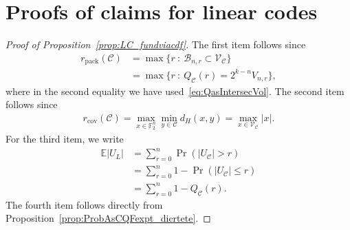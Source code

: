 \documentclass[article,doublecolumn]{IEEEtran}
\newcommand{\F}{{\mathbb{F}}}
\newcommand{\EE}{{\mathbb{E}}}
\newcommand{\BB}{{\mathcal{B}}}
\newcommand{\SSS}{{\mathcal{S}}}
\newcommand{\A}{{\mathcal{A}}}
\newcommand{\CC}{{\mathcal{C}}}
\newcommand{\rpack}{{r_{\mathrm{pack}}}}
\newcommand{\rcov}{{r_{\mathrm{cov}}}}
\newcommand{\VC}{\mathcal{V}_{\mathcal{C}}}
\begin{document}
\section{Proofs of claims for linear codes}
\label{app:discreteCDFproperties}

\begin{proof}[Proof of Proposition~\ref{prop:LC_fundviacdf}]
The first item follows since 
\begin{align}
\rpack(\CC)&=\max\{r~:~\BB_{n,r}\subset\VC\}\\
&=\max\{r~:~Q_{\CC}(r)=2^{k-n} V_{n,r}\},
\end{align}
where in the second equality we have used~\eqref{eq:QasIntersecVol}. The second item follows since
\begin{align}
 \rcov(\CC)=\max_{x\in\F_2^n}\min_{y\in\CC}d_H(x,y)=\max_{x\in \VC}|x|.   
\end{align}
For the third item, we write
\begin{align}
\EE|U_L|&=\sum_{r=0}^n \Pr(|U_\CC|> r)\\
&= \sum_{r=0}^n 1-\Pr(|U_\CC|\leq r)\\
&=\sum_{r=0}^n 1-Q_\CC(r).   
\end{align}
The fourth item follows directly from Proposition~\ref{prop:ProbAsCQFexpt_dicrtete}.
\end{proof}

\end{document}
